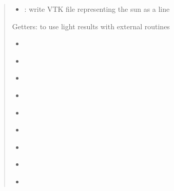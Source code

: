 \documentclass[letterpaper,10pt,english]{sphinxmanual}
\begin{document}
\begin{fulllineitems}
\begin{quote}
\begin{itemize}
\item {} 
\sphinxAtStartPar
{\hyperref[\detokenize{reference:LVM.LightVegeManager.VTK_sun}]{}}: write VTK file representing the sun as a line

\end{itemize}

\sphinxAtStartPar
Getters: to use light results with external routines
\begin{itemize}
\item {} 
\sphinxAtStartPar
{\hyperref[\detokenize{reference:LVM.LightVegeManager.riri5_transmitted_light}]{}}

\item {} 
\sphinxAtStartPar
{\hyperref[\detokenize{reference:LVM.LightVegeManager.riri5_intercepted_light}]{}}

\item {} 
\sphinxAtStartPar
{\hyperref[\detokenize{reference:LVM.LightVegeManager.elements_outputs}]{}}

\item {} 
\sphinxAtStartPar
{\hyperref[\detokenize{reference:LVM.LightVegeManager.triangles_outputs}]{}}

\item {} 
\sphinxAtStartPar
{\hyperref[\detokenize{reference:LVM.LightVegeManager.voxels_outputs}]{}}

\item {} 
\sphinxAtStartPar
{\hyperref[\detokenize{reference:LVM.LightVegeManager.sensors_outputs}]{}}

\item {} 
\sphinxAtStartPar
{\hyperref[\detokenize{reference:module-sun}]{}}

\item {} 
\sphinxAtStartPar
{\hyperref[\detokenize{reference:LVM.LightVegeManager.soilenergy}]{}}

\item {} 
\sphinxAtStartPar
{\hyperref[\detokenize{reference:LVM.LightVegeManager.maxtrianglearea}]{}}


\end{itemize}
\end{quote}
\end{fulllineitems}
\end{document}
